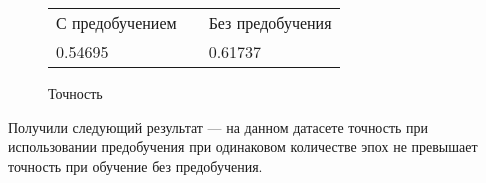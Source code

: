 {    \begin{figure}[H]
        \centering
        \begin{tabular}{|l|l|l|}
        \cline{1-1} \cline{3-3}
        С предобучением &  & Без предобучения \\ \cline{1-1} \cline{3-3} 
        0.54695 &  & 0.61737 \\ \cline{1-1} \cline{3-3} 
        \end{tabular}

        \caption{Точность}

    \end{figure}

    Получили следующий результат --- на данном датасете точность при использовании предобучения при одинаковом количестве эпох не превышает точность при обучение без предобучения.

}
\newcommand{\conclusion}{
    научились осуществлять предобучение нейронных сетей с помощью автоэнкодерного подхода.    
}




